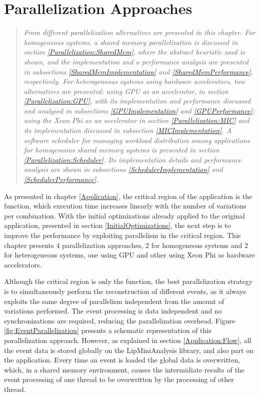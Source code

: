 \chapter{Parallelization Approaches}
\label{ParallelizationApproaches}

\begin{quote}
\textit{From different parallelization alternatives are presented in this chapter. For homogeneous systems, a shared memory parallelization is discussed in section \ref{Parallelization:SharedMem}, where the abstract heuristic used is shown, and the implementation and a performance analysis are presented in subsections \ref{SharedMemImplementation} and \ref{SharedMemPerformance}, respectively. For heterogeneous systems using hardware accelerators, two alternatives are presented: using GPU as an accelerator, in section \ref{Parallelization:GPU}, with its implementation and performance discussed and analysed in subsections \ref{GPUImplementation} and \ref{GPUPerformance}; using the \intel Xeon Phi as an accelerator in section \ref{Parallelization:MIC} and its implementation discussed in subsection \ref{MICImplementation}. A software scheduler for managing workload distribution among applications for homogeneous shared memory systems is presented in section \ref{Parallelization:Scheduler}. Its implementation details and performance analysis are shown in subsections \ref{SchedulerImplementation} and \ref{SchedulerPerformance}.}
\end{quote}

As presented in chapter \ref{Application}, the critical region of the \tth application is the \ttDilepKinFit function, which execution time increases linearly with the number of variations per combination. With the initial optimizations already applied to the original application, presented in section \ref{InitialOptimizations}, the next step is to improve the performance by exploiting parallelism in the critical region. This chapter presents 4 parallelization approaches, 2 for homogeneous systems and 2 for heterogeneous systems, one using GPU and other using \intel Xeon Phi as hardware accelerators.

Although the critical region is only the \ttDilepKinFit function, the best parallelization strategy is to simultaneously perform the reconstruction of different events, as it always exploits the same degree of parallelism independent from the amount of variations performed. The event processing is data independent and no synchronizations are required, reducing the parallelization overhead. Figure \ref{fig:EventParallelization} presents a schematic representation of this parallelization approach. However, as explained in section \ref{Application:Flow}, all the event data is stored globally on the LipMiniAnalysis library, and also part on the application. Every time an event is loaded the global data is overwritten, which, in a shared memory environment, causes the intermidiate results of the event processing of one thread to be overwritten by the processing of other thread.

